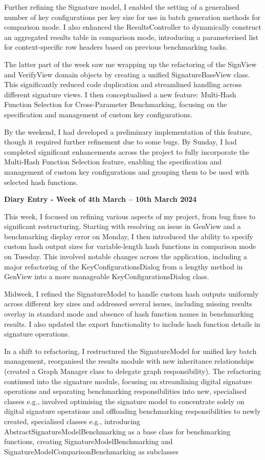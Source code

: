 \documentclass[]{final_report}
\theoremstyle{definition}
\begin{document}
Further refining the Signature model, I enabled the setting of a generalised number of key
configurations per key size for use in batch generation methods for comparison mode. I also enhanced
the ResultsController to dynamically construct an aggregated results table in comparison mode,
introducing a parameterised list for context-specific row headers based on previous benchmarking
tasks.

The latter part of the week saw me wrapping up the refactoring of the SignView and VerifyView domain
objects by creating a unified SignatureBaseView class. This significantly reduced code duplication
and streamlined handling across different signature views. I then conceptualised a new feature:
Multi-Hash Function Selection for Cross-Parameter Benchmarking, focusing on the specification and
management of custom key configurations.

By the weekend, I had developed a preliminary implementation of this feature, though it required
further refinement due to some bugs. By Sunday, I had completed significant enhancements across the
project to fully incorporate the Multi-Hash Function Selection feature, enabling the specification
and management of custom key configurations and grouping them to be used with selected hash
functions.

\textbf{Diary Entry - Week of 4th March – 10th March 2024}

This week, I focused on refining various aspects of my project, from bug fixes to significant
restructuring. Starting with resolving an issue in GenView and a benchmarking display error on
Monday, I then introduced the ability to specify custom hash output sizes for variable-length hash
functions in comparison mode on Tuesday. This involved notable changes across the application,
including a major refactoring of the KeyConfigurationsDialog from a lengthy method in GenView into a
more manageable KeyConfigurationsDialog class.

Midweek, I refined the SignatureModel to handle custom hash outputs uniformly across different key
sizes and addressed several issues, including missing results overlay in standard mode and absence
of hash function names in benchmarking results. I also updated the export functionality to include
hash function details in signature operations.

In a shift to refactoring, I restructured the SignatureModel for unified key batch management,
reorganised the results module with new inheritance relationships (created a Graph Manager class to
delegate graph responsibility). The refactoring continued into the signature module, focusing on
streamlining digital signature operations and separating benchmarking responsibilities into new,
specialised classes e.g., involved optimising the signature model to concentrate solely on digital
signature operations and offloading benchmarking responsibilities to newly created, specialised
classes e.g., introducing AbstractSignatureModelBenchmarking as a base class for benchmarking
functions, creating SignatureModelBenchmarking and SignatureModelComparisonBenchmarking as
subclasses
\end{document}
